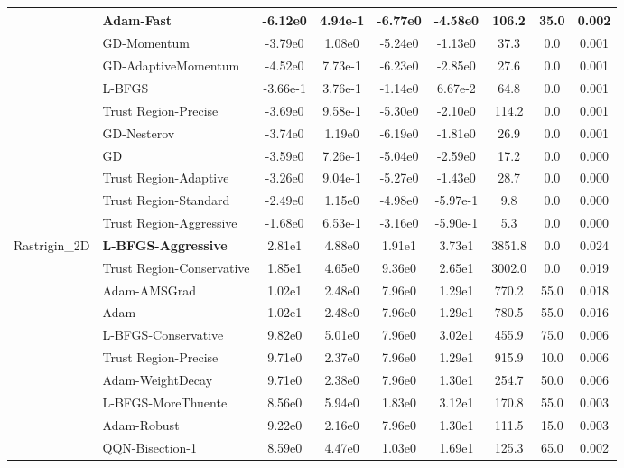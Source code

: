 \documentclass[10pt]{article}
\begin{document}
\begin{longtable}{|l|l|c|c|c|c|c|c|c|}
\hline
 & Adam-Fast & -6.12e0 & 4.94e-1 & -6.77e0 & -4.58e0 & 106.2 & 35.0 & 0.002 \\
\hline
 & GD-Momentum & -3.79e0 & 1.08e0 & -5.24e0 & -1.13e0 & 37.3 & 0.0 & 0.001 \\
\hline
 & GD-AdaptiveMomentum & -4.52e0 & 7.73e-1 & -6.23e0 & -2.85e0 & 27.6 & 0.0 & 0.001 \\
\hline
 & L-BFGS & -3.66e-1 & 3.76e-1 & -1.14e0 & 6.67e-2 & 64.8 & 0.0 & 0.001 \\
\hline
 & Trust Region-Precise & -3.69e0 & 9.58e-1 & -5.30e0 & -2.10e0 & 114.2 & 0.0 & 0.001 \\
\hline
 & GD-Nesterov & -3.74e0 & 1.19e0 & -6.19e0 & -1.81e0 & 26.9 & 0.0 & 0.001 \\
\hline
 & GD & -3.59e0 & 7.26e-1 & -5.04e0 & -2.59e0 & 17.2 & 0.0 & 0.000 \\
\hline
 & Trust Region-Adaptive & -3.26e0 & 9.04e-1 & -5.27e0 & -1.43e0 & 28.7 & 0.0 & 0.000 \\
\hline
 & Trust Region-Standard & -2.49e0 & 1.15e0 & -4.98e0 & -5.97e-1 & 9.8 & 0.0 & 0.000 \\
\hline
 & Trust Region-Aggressive & -1.68e0 & 6.53e-1 & -3.16e0 & -5.90e-1 & 5.3 & 0.0 & 0.000 \\
Rastrigin\_2D & \textbf{L-BFGS-Aggressive} & 2.81e1 & 4.88e0 & 1.91e1 & 3.73e1 & 3851.8 & 0.0 & 0.024 \\
\hline
 & Trust Region-Conservative & 1.85e1 & 4.65e0 & 9.36e0 & 2.65e1 & 3002.0 & 0.0 & 0.019 \\
\hline
 & Adam-AMSGrad & 1.02e1 & 2.48e0 & 7.96e0 & 1.29e1 & 770.2 & 55.0 & 0.018 \\
\hline
 & Adam & 1.02e1 & 2.48e0 & 7.96e0 & 1.29e1 & 780.5 & 55.0 & 0.016 \\
\hline
 & L-BFGS-Conservative & 9.82e0 & 5.01e0 & 7.96e0 & 3.02e1 & 455.9 & 75.0 & 0.006 \\
\hline
 & Trust Region-Precise & 9.71e0 & 2.37e0 & 7.96e0 & 1.29e1 & 915.9 & 10.0 & 0.006 \\
\hline
 & Adam-WeightDecay & 9.71e0 & 2.38e0 & 7.96e0 & 1.30e1 & 254.7 & 50.0 & 0.006 \\
\hline
 & L-BFGS-MoreThuente & 8.56e0 & 5.94e0 & 1.83e0 & 3.12e1 & 170.8 & 55.0 & 0.003 \\
\hline
 & Adam-Robust & 9.22e0 & 2.16e0 & 7.96e0 & 1.30e1 & 111.5 & 15.0 & 0.003 \\
\hline
 & QQN-Bisection-1 & 8.59e0 & 4.47e0 & 1.03e0 & 1.69e1 & 125.3 & 65.0 & 0.002 \\
\hline

\end{longtable}
\end{document}
